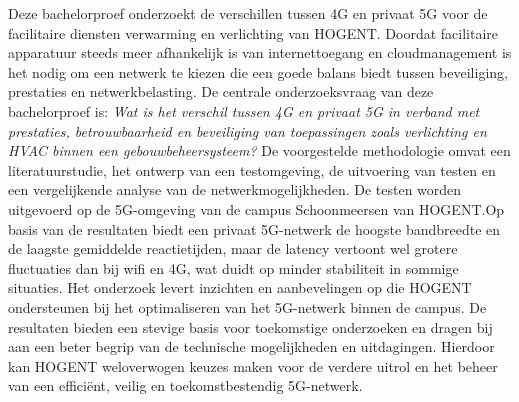 Deze bachelorproef onderzoekt de verschillen tussen 4G en privaat 5G voor de facilitaire diensten verwarming en verlichting van HOGENT. Doordat facilitaire apparatuur steeds meer afhankelijk is van internettoegang en cloudmanagement is het nodig om een netwerk te kiezen die een goede balans biedt tussen beveiliging, prestaties en netwerkbelasting. De centrale onderzoeksvraag van deze bachelorproef is: \textit{Wat is het verschil tussen 4G en privaat 5G in verband met prestaties, betrouwbaarheid en beveiliging van toepassingen zoals verlichting en HVAC binnen een gebouwbeheersysteem?} De voorgestelde methodologie omvat een literatuurstudie, het ontwerp van een testomgeving, de uitvoering van testen en een vergelijkende analyse van de netwerkmogelijkheden. De testen worden uitgevoerd op de 5G-omgeving van de campus Schoonmeersen van HOGENT.Op basis van de resultaten biedt een privaat 5G-netwerk de hoogste bandbreedte en de laagste gemiddelde reactietijden, maar de latency vertoont wel grotere fluctuaties dan bij wifi en 4G, wat duidt op minder stabiliteit in sommige situaties. Het onderzoek levert inzichten en  aanbevelingen op die HOGENT ondersteunen bij het optimaliseren van het 5G-netwerk binnen de campus. De resultaten bieden een stevige basis voor toekomstige onderzoeken en dragen bij aan een beter begrip van de technische mogelijkheden en uitdagingen. Hierdoor kan HOGENT weloverwogen keuzes maken voor de verdere uitrol en het beheer van een efficiënt, veilig en toekomstbestendig 5G-netwerk.
